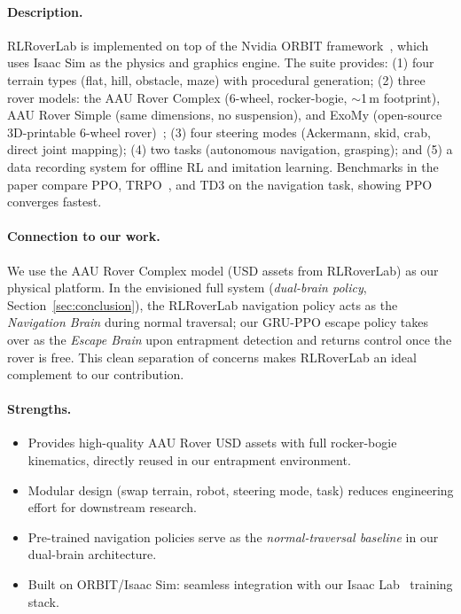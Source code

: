 \documentclass[12pt,a4paper]{article}
\begin{document}
\paragraph{Description.} RLRoverLab is implemented on top of the Nvidia ORBIT framework~\cite{mittal2023orbit}, which uses Isaac Sim as the physics and graphics engine. The suite provides: (1) four terrain types (flat, hill, obstacle, maze) with procedural generation; (2) three rover models: the AAU Rover Complex (6-wheel, rocker-bogie, $\sim$1\,m footprint), AAU Rover Simple (same dimensions, no suspension), and ExoMy (open-source 3D-printable 6-wheel rover)~\cite{voellmy2020exomy}; (3) four steering modes (Ackermann, skid, crab, direct joint mapping); (4) two tasks (autonomous navigation, grasping); and (5) a data recording system for offline RL and imitation learning. Benchmarks in the paper compare PPO, TRPO~\cite{schulman2015trpo}, and TD3 on the navigation task, showing PPO converges fastest.

\paragraph{Connection to our work.} We use the AAU Rover Complex model (USD assets from RLRoverLab) as our physical platform. In the envisioned full system (\textit{dual-brain policy}, Section~\ref{sec:conclusion}), the RLRoverLab navigation policy acts as the \textit{Navigation Brain} during normal traversal; our GRU-PPO escape policy takes over as the \textit{Escape Brain} upon entrapment detection and returns control once the rover is free. This clean separation of concerns makes RLRoverLab an ideal complement to our contribution.

\paragraph{Strengths.}
\begin{itemize}
    \item Provides high-quality AAU Rover USD assets with full rocker-bogie kinematics, directly reused in our entrapment environment.
    \item Modular design (swap terrain, robot, steering mode, task) reduces engineering effort for downstream research.
    \item Pre-trained navigation policies serve as the \textit{normal-traversal baseline} in our dual-brain architecture.
    \item Built on ORBIT/Isaac Sim: seamless integration with our Isaac Lab~\cite{isaaclab} training stack.
\end{itemize}
\end{document}
